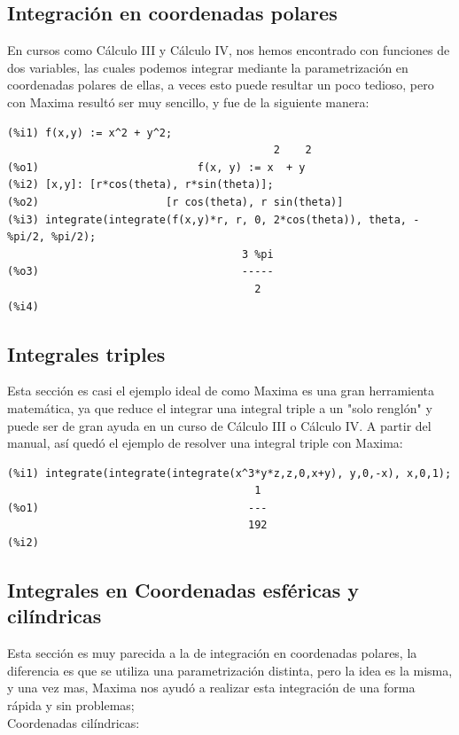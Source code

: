 \documentclass[12pt,letterpaper]{article}
\begin{document}
\subsection{Integración en coordenadas polares}
En cursos como Cálculo III y Cálculo IV, nos hemos encontrado con funciones de dos variables, las cuales podemos integrar mediante la parametrización en coordenadas polares de ellas, a veces esto puede resultar un poco tedioso, pero con Maxima resultó ser muy sencillo, y fue de la siguiente manera: 

\begin{verbatim}
(%i1) f(x,y) := x^2 + y^2;
                                          2    2
(%o1)                         f(x, y) := x  + y
(%i2) [x,y]: [r*cos(theta), r*sin(theta)];
(%o2)                    [r cos(theta), r sin(theta)]
(%i3) integrate(integrate(f(x,y)*r, r, 0, 2*cos(theta)), theta, -%pi/2, %pi/2);
                                     3 %pi
(%o3)                                -----
                                       2
(%i4) 
\end{verbatim}

\subsection{Integrales triples}
Esta sección es casi el ejemplo ideal de como Maxima es una gran herramienta matemática, ya que reduce el integrar una integral triple a un "solo renglón" y puede ser de gran ayuda en un curso de Cálculo III o Cálculo IV. A partir del manual, así quedó el ejemplo de resolver una integral triple con Maxima:

\begin{verbatim}
(%i1) integrate(integrate(integrate(x^3*y*z,z,0,x+y), y,0,-x), x,0,1);
                                       1
(%o1)                                 ---
                                      192
(%i2) 
\end{verbatim}

\subsection{Integrales en Coordenadas esféricas y cilíndricas}
Esta sección es muy parecida a la de integración en coordenadas polares, la diferencia es que se utiliza una parametrización distinta, pero la idea es la misma, y una vez mas, Maxima nos ayudó a realizar esta integración de una forma rápida y sin problemas;\\

Coordenadas cilíndricas:
\end{document}
